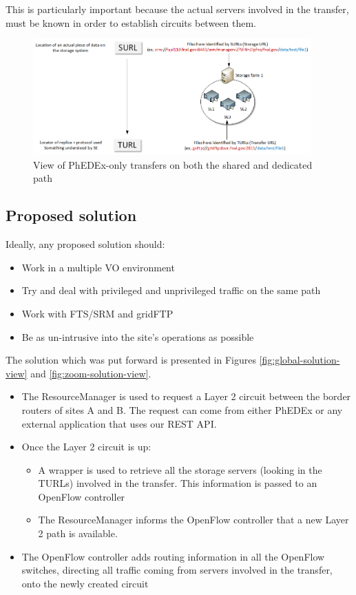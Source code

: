 This is particularly important because the actual servers involved in the transfer, 
must be known in order to establish circuits between them.

\begin{figure}[h]
  \centering
  \includegraphics[width=0.95\textwidth]{Figures/TURL_to_SURL.png}
  \caption{View of PhEDEx-only transfers on both the shared and dedicated path}
  \label{fig:SURL-to-TURLs}
\end{figure} 

\subsection{Proposed solution}

Ideally, any proposed solution should:
\begin{itemize}
	\item Work in a multiple VO environment
	\item Try and deal with privileged and unprivileged traffic on the same path
	\item Work with FTS/SRM and gridFTP
	\item Be as un-intrusive into the site's operations as possible
\end{itemize}

The solution which was put forward is presented in Figures \ref{fig:global-solution-view} 
and \ref{fig:zoom-solution-view}. 

\begin{itemize}
	\item The ResourceManager is used to request a Layer 2 circuit between the border routers
	of sites A and B. The request can come from either PhEDEx or any external application that 
	uses our REST API.
	\item Once the Layer 2 circuit is up:
		\begin{itemize}
			\item A wrapper is used to retrieve all the storage servers (looking in the TURLs) 
			involved in the transfer. This information is passed to an OpenFlow controller
			\item The ResourceManager informs the OpenFlow controller that a new Layer 2 path 
			is available.
		\end{itemize}
	\item The OpenFlow controller adds routing information in all the OpenFlow switches, 
	directing all traffic coming from servers involved in the transfer, onto the newly created 
	circuit
\end{itemize}

